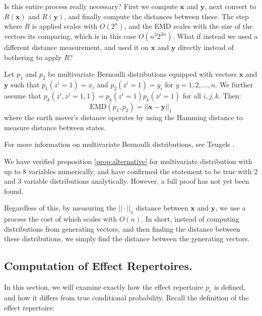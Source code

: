 Is this entire process really necessary? First we compute $\mathbf{x}$ and $\mathbf{y}$, next convert to $R(\mathbf{x})$ and $R(\mathbf{y})$, and finally compute the distances between these. The step where $R$ is applied scales with $O(2^n)$, and the EMD scales with the size of the vectors its comparing, which is in this case $O(n^3 2^{3n})$. What if instead we used a different distance measurement, and used it on $\mathbf{x}$ and $\mathbf{y}$ directly instead of bothering to apply $R$?

\begin{prop}
	\label{prop:alternative}
	Let $p_1$ and $p_2$ be multivariate Bernoulli distributions equipped with vectors $\mathbf{x}$ and $\mathbf{y}$ such that $p_1(z^i=1) = x_i$ and $p_2(z^i = 1) = y_i$ for $y = 1, 2, \ldots, n$. We further assume that $p_k(z^i, z^j = 1,1) = p_k(z^i = 1) p_k(z^j=1)$ for all $i,j,k$. Then:
	\begin{equation}
	\text{EMD}(p_1, p_2) = ||\mathbf{x} - \mathbf{y}||_1
	\end{equation}
	where the earth mover's distance operates by using the Hamming distance to measure distance between states.
	
	
\end{prop}

\begin{remark}
	For more information on multivariate Bernoulli distributions, see Teugels \cite{teugels1990some}.
\end{remark}

We have verified proposition \ref{prop:alternative} for multivariate distribution with up to 8 variables numerically, and have confirmed the statement to be true with 2 and 3 variable distributions analytically. However, a full proof has not yet been found. 

Regardless of this, by measuring the $||\cdot||_1$ distance between $\mathbf{x} $ and $\mathbf{y}$, we use a process the cost of which scales with $O(n)$. In short, instead of computing distributions from generating vectors, and then finding the distance between these distributions, we simply find the distance between the generating vectors.


\subsection{Computation of Effect Repertoires.}

In this section, we will examine exactly how the effect repertoire $p_e$ is defined, and how it differs from true conditional probability. Recall the definition of the effect repertoire:

